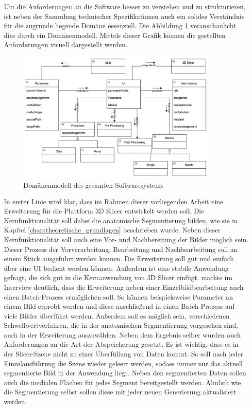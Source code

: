 Um die Anforderungen an die Software besser zu verstehen und zu strukturieren,
ist neben der Sammlung technischer Spezifikationen auch ein solides Verständnis
für die zugrunde liegende Domäne essenziell. Die Abbildung \ref{fig:3d_slicer_domäne}
veranschaulicht dies durch ein Domänenmodell. Mittels dieser Grafik können die
gestellten Anforderungen visuell dargestellt werden.

\begin{figure}[h]
	\centering
	\includegraphics[width=0.9\textwidth]{img/domaene.png}
	\caption{Domänenmodell des gesamten Softwaresystems}
	\label{fig:3d_slicer_domäne}
\end{figure}

In erster Linie wird klar, dass im Rahmen dieser vorliegenden Arbeit eine
Erweiterung für die Plattform 3D Slicer entwickelt werden soll. Die Kernfunktionalität
soll dabei die anatomische Segmentierung bilden, wie sie in Kapitel
\ref{chap:theoretische_grundlagen} beschrieben wurde. Neben dieser Kernfunktionalität
soll auch eine Vor- und Nachbereitung der Bilder möglich sein. Dieser Prozess der
Vorverarbeitung, Bearbeitung und Nachbearbeitung soll an einem Stück ausgeführt
werden können. Die Erweiterung soll gut und einfach über eine \ac{UI} bedient
werden können. Außerdem ist eine stabile Anwendung gefragt, die sich gut in die
Kernanwendung von 3D Slicer einfügt. \citet[]{walter2025} machte im Interview
deutlich, dass die Erweiterung neben einer Einzelbildbearbeitung auch einen Batch-Prozess
ermöglichen soll. So können beispielsweise Parameter an einem Bild erprobt
werden und diese anschließend in einen Batch-Prozess auf viele Bilder überführt
werden. Außerdem soll es möglich sein, verschiedenen Schwellwertverfahren, die in
der anatomischen Segmentierung vorgesehen sind, auch in der Erweiterung
auszuwählen. Neben dem Ergebnis selber wurden auch Anforderungen an die Art der Abspeicherung
gesetzt. Es ist wichtig, dass es in der Slicer-Szene nicht zu einer Überfüllung von
Daten kommt. So soll nach jeder Einzelausführung die Szene wieder geleert werden,
sodass immer nur das aktuell segmentierte Bild in der Anwendung liegt. Neben den
segmentierten Daten sollen auch die medialen Flächen für jedes Segment
bereitgestellt werden. Ähnlich wie die Segmentierung selbst sollen diese mit jeder
neuen Generierung aktualisiert werden.

